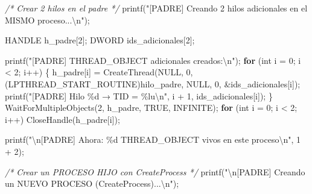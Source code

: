 \documentclass[
  spanish,
]{article}
\newenvironment{Shaded}{}{}
\newcommand{\CommentTok}[1]{\textcolor[rgb]{0.38,0.63,0.69}{\textit{#1}}}
\newcommand{\ControlFlowTok}[1]{\textcolor[rgb]{0.00,0.44,0.13}{\textbf{#1}}}
\newcommand{\DataTypeTok}[1]{\textcolor[rgb]{0.56,0.13,0.00}{#1}}
\newcommand{\DecValTok}[1]{\textcolor[rgb]{0.25,0.63,0.44}{#1}}
\newcommand{\NormalTok}[1]{#1}
\newcommand{\OperatorTok}[1]{\textcolor[rgb]{0.40,0.40,0.40}{#1}}
\newcommand{\SpecialCharTok}[1]{\textcolor[rgb]{0.25,0.44,0.63}{#1}}
\newcommand{\StringTok}[1]{\textcolor[rgb]{0.25,0.44,0.63}{#1}}
\begin{document}
\begin{Shaded}
\begin{Highlighting}[]
    \CommentTok{/* Crear 2 hilos en el padre */}
\NormalTok{    printf}\OperatorTok{(}\StringTok{"[PADRE] Creando 2 hilos adicionales en el MISMO proceso...}\SpecialCharTok{\textbackslash{}n}\StringTok{"}\OperatorTok{);}

\NormalTok{    HANDLE h\_padre}\OperatorTok{[}\DecValTok{2}\OperatorTok{];}
\NormalTok{    DWORD ids\_adicionales}\OperatorTok{[}\DecValTok{2}\OperatorTok{];}

\NormalTok{    printf}\OperatorTok{(}\StringTok{"[PADRE]   THREAD\_OBJECT adicionales creados:}\SpecialCharTok{\textbackslash{}n}\StringTok{"}\OperatorTok{);}
    \ControlFlowTok{for} \OperatorTok{(}\DataTypeTok{int}\NormalTok{ i }\OperatorTok{=} \DecValTok{0}\OperatorTok{;}\NormalTok{ i }\OperatorTok{\textless{}} \DecValTok{2}\OperatorTok{;}\NormalTok{ i}\OperatorTok{++)} \OperatorTok{\{}
\NormalTok{        h\_padre}\OperatorTok{[}\NormalTok{i}\OperatorTok{]} \OperatorTok{=}\NormalTok{ CreateThread}\OperatorTok{(}\NormalTok{NULL}\OperatorTok{,} \DecValTok{0}\OperatorTok{,}
            \OperatorTok{(}\NormalTok{LPTHREAD\_START\_ROUTINE}\OperatorTok{)}\NormalTok{hilo\_padre}\OperatorTok{,}\NormalTok{ NULL}\OperatorTok{,} \DecValTok{0}\OperatorTok{,} \OperatorTok{\&}\NormalTok{ids\_adicionales}\OperatorTok{[}\NormalTok{i}\OperatorTok{]);}
\NormalTok{        printf}\OperatorTok{(}\StringTok{"[PADRE]     Hilo }\SpecialCharTok{\%d}\StringTok{ → TID = }\SpecialCharTok{\%lu\textbackslash{}n}\StringTok{"}\OperatorTok{,}\NormalTok{ i }\OperatorTok{+} \DecValTok{1}\OperatorTok{,}\NormalTok{ ids\_adicionales}\OperatorTok{[}\NormalTok{i}\OperatorTok{]);}
    \OperatorTok{\}}
\NormalTok{    WaitForMultipleObjects}\OperatorTok{(}\DecValTok{2}\OperatorTok{,}\NormalTok{ h\_padre}\OperatorTok{,}\NormalTok{ TRUE}\OperatorTok{,}\NormalTok{ INFINITE}\OperatorTok{);}
    \ControlFlowTok{for} \OperatorTok{(}\DataTypeTok{int}\NormalTok{ i }\OperatorTok{=} \DecValTok{0}\OperatorTok{;}\NormalTok{ i }\OperatorTok{\textless{}} \DecValTok{2}\OperatorTok{;}\NormalTok{ i}\OperatorTok{++)}\NormalTok{ CloseHandle}\OperatorTok{(}\NormalTok{h\_padre}\OperatorTok{[}\NormalTok{i}\OperatorTok{]);}

\NormalTok{    printf}\OperatorTok{(}\StringTok{"}\SpecialCharTok{\textbackslash{}n}\StringTok{[PADRE] Ahora: }\SpecialCharTok{\%d}\StringTok{ THREAD\_OBJECT vivos en este proceso}\SpecialCharTok{\textbackslash{}n}\StringTok{"}\OperatorTok{,} \DecValTok{1} \OperatorTok{+} \DecValTok{2}\OperatorTok{);}

    \CommentTok{/* Crear un PROCESO HIJO con CreateProcess */}
\NormalTok{    printf}\OperatorTok{(}\StringTok{"}\SpecialCharTok{\textbackslash{}n}\StringTok{[PADRE] Creando un NUEVO PROCESO (CreateProcess)...}\SpecialCharTok{\textbackslash{}n}\StringTok{"}\OperatorTok{);}


\end{Highlighting}
\end{Shaded}
\end{document}
